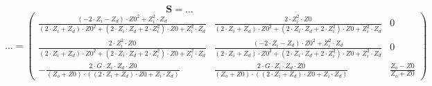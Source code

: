 \[ \mathbf{S}=\ldots \]
\[ \ldots =\left(\begin{smallmatrix} \frac{\left(-2\cdot Z_i - Z_d
\right)\cdot Z0^2+ Z_i ^2\cdot Z_d }{\left(2\cdot Z_i + Z_d
\right)\cdot Z0^2+\left(2\cdot Z_i \cdot Z_d +2\cdot Z_i
^2\right)\cdot Z0+ Z_i ^2\cdot Z_d } & \frac{2\cdot Z_i ^2\cdot
Z0}{\left(2\cdot Z_i + Z_d \right)\cdot Z0^2+\left(2\cdot Z_i \cdot
Z_d +2\cdot Z_i ^2\right)\cdot Z0+ Z_i ^2\cdot Z_d } & 0 \\
\frac{2\cdot Z_i ^2\cdot Z0}{\left(2\cdot Z_i + Z_d \right)\cdot
Z0^2+\left(2\cdot Z_i \cdot Z_d +2\cdot Z_i ^2\right)\cdot Z0+ Z_i
^2\cdot Z_d } & \frac{\left(-2\cdot Z_i - Z_d \right)\cdot Z0^2+ Z_i
^2\cdot Z_d }{\left(2\cdot Z_i + Z_d \right)\cdot Z0^2+\left(2\cdot
Z_i \cdot Z_d +2\cdot Z_i ^2\right)\cdot Z0+ Z_i ^2\cdot Z_d } & 0 \\
-\frac{2\cdot G \cdot Z_i \cdot Z_d \cdot Z0}{\left( Z_o
+Z0\right)\cdot \left(\left(2\cdot Z_i + Z_d \right)\cdot Z0+ Z_i
\cdot Z_d \right)} & \frac{2\cdot G \cdot Z_i \cdot Z_d \cdot
Z0}{\left( Z_o +Z0\right)\cdot \left(\left(2\cdot Z_i + Z_d
\right)\cdot Z0+ Z_i \cdot Z_d \right)} & \frac{ Z_o -Z0}{ Z_o +Z0}
\end{smallmatrix}\right) \]
